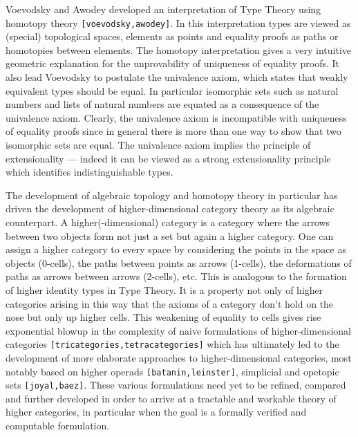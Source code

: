 \documentclass[twocolumn,a4paper]{article}
\renewcommand{\cite}[1]{{\tt[#1]}}
\begin{document}
Voevodsky and Awodey developed an interpretation of Type Theory using
homotopy theory \cite{voevodsky,awodey}. In this interpretation types
are viewed as (special) topological spaces, elements as points and
equality proofs as paths or homotopies between elements. The homotopy
interpretation gives a very intuitive geometric explanation for the
unprovability of uniqueness of equality proofs. It also lead Voevodsky
to postulate the univalence axiom, which states that weakly equivalent
types should be equal. In particular isomorphic sets such as natural
numbers and lists of natural numbers are equated as a consequence of
the univalence axiom. Clearly, the univalence axiom is incompatible
with uniqueness of equality proofs since in general there is more than
one way to show that two isomorphic sets are equal. The univalence
axiom implies the principle of extensionality --- indeed it can be viewed
as a strong extensionality principle which identifies
indistinguishable types.  

The development of algebraic topology and homotopy theory in
particular has driven the development of higher-dimensional category
theory as its algebraic counterpart. A higher(-dimensional) category
is a category where the arrows between two objects form not just a set
but again a higher category. One can assign a higher category to every
space by considering the points in the space as objects (0-cells), the
paths between points as arrows (1-cells), the deformations of paths as
arrows between arrows (2-cells), etc. This is analogous to the
formation of higher identity types in Type Theory. It is a property
not only of higher categories arising in this way that the axioms of a
category don't hold on the nose but only up higher cells. This
weakening of equality to cells gives rise exponential blowup in the
complexity of naive formulations of higher-dimensional categories
\cite{tricategories,tetracategories} which has ultimately led to the
development of more elaborate approaches to higher-dimensional categories,
most notably based on higher operads
\cite{batanin,leinster}, simplicial and opetopic sets \cite{joyal,baez}.  These
various formulations need yet to be refined, compared and further
developed in order to arrive at a tractable and workable theory of
higher categories, in particular when the goal is a formally verified
and computable formulation.
\end{document}
